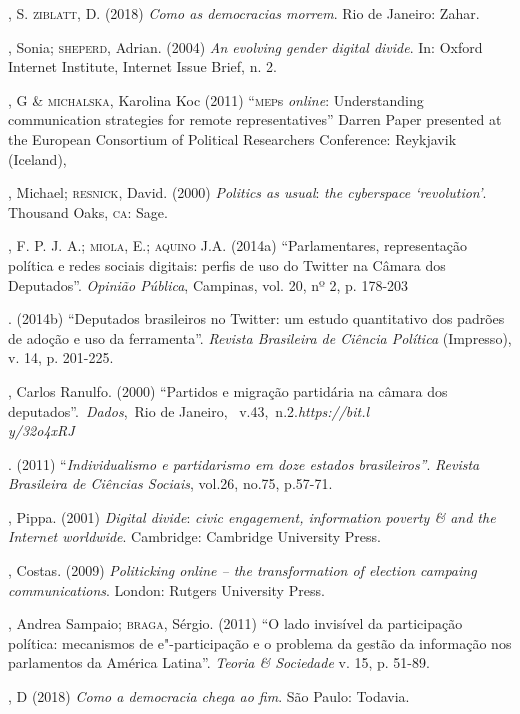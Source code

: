 \begin{bibliohedra}
, S. \textsc{ziblatt}, D. (2018) \emph{Como as democracias morrem}. Rio
de Janeiro: Zahar.

, Sonia; \textsc{sheperd}, Adrian. (2004) \emph{An evolving gender digital
divide}. In: Oxford Internet Institute, Internet Issue Brief, n. 2.

, G \& \textsc{michalska}, Karolina Koc (2011) ``\textsc{mep}s \emph{\emph{online}}:
Understanding communication strategies for remote representatives''
Darren Paper presented at the European Consortium of Political
Researchers Conference: Reykjavik (Iceland),

, Michael; \textsc{resnick}, David. (2000) \emph{Politics as usual}:
\emph{the cyberspace `revolution'}. Thousand Oaks, \textsc{ca}: Sage.

, F. P. J. A.; \textsc{miola}, E.; \textsc{aquino} J.A. (2014a) ``Parlamentares,
representação política e redes sociais digitais: perfis de uso do
Twitter na Câmara dos Deputados''. \emph{Opinião Pública}, Campinas,
vol. 20, nº 2, p. 178-203

\titidem. (2014b) ``Deputados
brasileiros no Twitter: um estudo quantitativo dos padrões de adoção e
uso da ferramenta''. \emph{Revista Brasileira de Ciência Política}
(Impresso), v. 14, p. 201-225.

, Carlos Ranulfo. (2000) ``Partidos e migração partidária na câmara
dos deputados''.~\emph{Dados},~Rio de Janeiro,~
v.43,~n.2.\emph{https://bit.l\\y/32o4xRJ}

\titidem. (2011) ``\emph{Individualismo e partidarismo em
doze estados brasileiros''}. \emph{Revista Brasileira de Ciências
Sociais}, vol.26, no.75, p.57-71.

, Pippa. (2001) \emph{Digital divide}: \emph{civic engagement,
information poverty \& and the Internet worldwide}. Cambridge: Cambridge
University Press.

, Costas. (2009) \emph{Politicking \emph{\emph{online}} -- the
transformation of election campaing communications}. London: Rutgers
University Press.

, Andrea Sampaio; \textsc{braga}, Sérgio. (2011) ``O lado invisível da
participação política: mecanismos de e"-participação e o problema da
gestão da informação nos parlamentos da América Latina''. \emph{Teoria
\& Sociedade} v. 15, p. 51-89.

, D (2018) \emph{Como a democracia chega ao fim}. São Paulo:
Todavia.


\end{bibliohedra}
